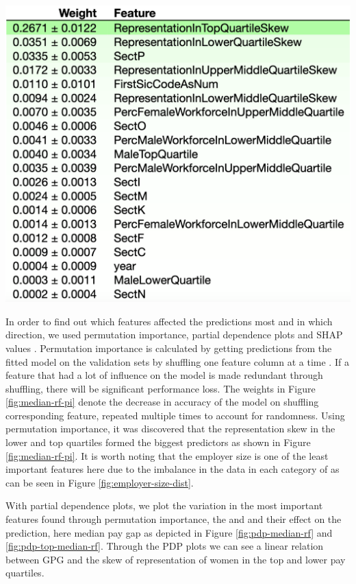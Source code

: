 \begin{centering}
    \includegraphics[width=0.99\linewidth]{images/PI-with-extra-features.png}
    \label{fig:median-rf-pi}
\end{centering}

In order to find out which features affected the predictions most and in which direction, we used permutation importance, partial dependence plots and SHAP values \cite{Molnar2020}.
Permutation importance is calculated by getting predictions from the fitted model on the validation sets by shuffling one feature column at a time \cite{Altmann2010}. If a feature that had a lot of influence on the model is made redundant through shuffling, there will be significant performance loss. 
The weights in Figure \ref{fig:median-rf-pi} denote the decrease in accuracy of the model on shuffling corresponding feature, repeated multiple times to account for randomness.
Using permutation importance, it was discovered that the representation skew in the lower and top quartiles formed the biggest predictors as shown in Figure \ref{fig:median-rf-pi}. 
It is worth noting that the employer size is one of the least important features here due to the imbalance in the data in each category of  as can be seen in Figure \ref{fig:employer-size-dist}.


With partial dependence plots, we plot the variation in the most important features found through permutation importance, the  and  and their effect on the prediction, here median pay gap as depicted in Figure \ref{fig:pdp-median-rf} and \ref{fig:pdp-top-median-rf}. Through the PDP plots we can see a linear relation between GPG and the skew of representation of women in the top and lower pay quartiles.

